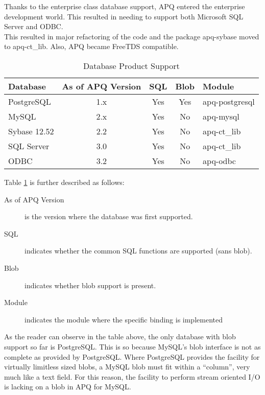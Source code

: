 \documentclass[english,letterpaper]{book}
\begin{document}
Thanks to the enterprise class database support, APQ entered the
enterprise development world. This resulted in needing to support
both Microsoft SQL Server and
ODBC.\\

This resulted in major refactoring of the code and the package apq-sybase moved
to apq-ct\_lib. Also, APQ became FreeTDS compatible.

\begin{table}{
   \begin{tabular}{lcccl}
   Database       &  As of APQ Version &  SQL   &  Blob &  Module          \\
   \hline
   PostgreSQL     &  1.x               &  Yes   &  Yes  &  apq-postgresql  \\
   MySQL          &  2.x               &  Yes   &  No   &  apq-mysql       \\
   Sybase 12.52   &  2.2               &  Yes   &  No   &  apq-ct\_lib      \\
   SQL Server     &  3.0               &  Yes   &  No   &  apq-ct\_lib      \\
   ODBC           & 3.2                &  Yes   &  No   &  apq-odbc
   \end{tabular}}
   \caption{Database Product Support}\label{t:DBSupport}
\end{table}


Table \ref{t:DBSupport} is further described as follows:

\begin{description}
   \item [As of APQ Version]is the version where the database was first supported.
   \item [SQL]indicates whether the common SQL functions are supported (sans blob).
   \item [Blob]indicates whether blob support is present.
   \item [Module]indicates the module where the specific binding is implemented
\end{description}

As the reader can observe in the table above, the only database with blob support
so far is PostgreSQL. This is so because MySQL's blob interface is not as complete as provided by PostgreSQL.
Where PostgreSQL provides the facility for virtually limitless sized
blobs, a MySQL blob must fit within a ``column'', very much like
a text field. For this reason, the facility to perform stream oriented
I/O is lacking on a blob in APQ for MySQL.\\
\end{document}
